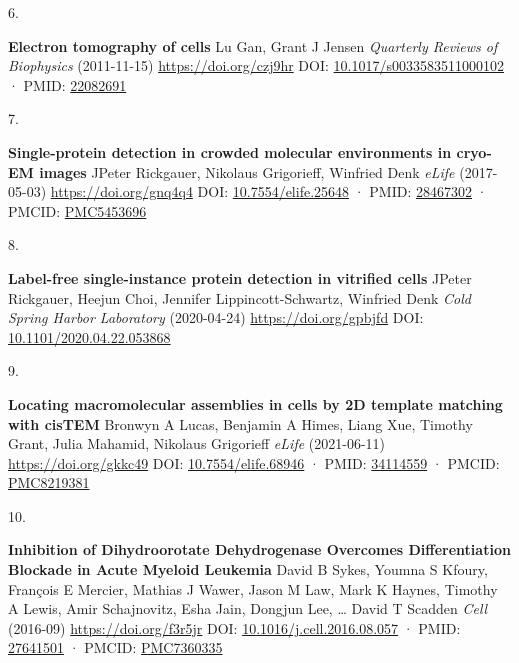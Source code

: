 \documentclass[
]{article}
\newlength{\cslhangindent}
\newlength{\csllabelwidth}
\newlength{\cslentryspacingunit} %
\newenvironment{CSLReferences}[2] %
 {%
  \setlength{\parindent}{0pt}
  \ifodd #1
  \let\oldpar\par
  \def\par{\hangindent=\cslhangindent\oldpar}
  \fi
  \setlength{\parskip}{#2\cslentryspacingunit}
 }%
 {}
\newcommand{\CSLBlock}[1]{#1\hfill\break}
\newcommand{\CSLLeftMargin}[1]{\parbox[t]{\csllabelwidth}{#1}}
\newcommand{\CSLRightInline}[1]{\parbox[t]{\linewidth - \csllabelwidth}{#1}\break}
\begin{document}
\begin{CSLReferences}{0}{0}
\leavevmode{}%
\CSLLeftMargin{6. }%
\CSLRightInline{\textbf{Electron tomography of cells}
\CSLBlock{Lu Gan, Grant J Jensen} \emph{Quarterly Reviews of Biophysics} (2011-11-15) \url{https://doi.org/czj9hr}
\CSLBlock{DOI: \href{https://doi.org/10.1017/s0033583511000102}{10.1017/s0033583511000102} · PMID: \href{https://www.ncbi.nlm.nih.gov/pubmed/22082691}{22082691}}}

\leavevmode{}%
\CSLLeftMargin{7. }%
\CSLRightInline{\textbf{Single-protein detection in crowded molecular environments in cryo-EM images}
\CSLBlock{JPeter Rickgauer, Nikolaus Grigorieff, Winfried Denk} \emph{eLife} (2017-05-03) \url{https://doi.org/gnq4q4}
\CSLBlock{DOI: \href{https://doi.org/10.7554/elife.25648}{10.7554/elife.25648} · PMID: \href{https://www.ncbi.nlm.nih.gov/pubmed/28467302}{28467302} · PMCID: \href{https://www.ncbi.nlm.nih.gov/pmc/articles/PMC5453696}{PMC5453696}}}

\leavevmode{}%
\CSLLeftMargin{8. }%
\CSLRightInline{\textbf{Label-free single-instance protein detection in vitrified cells}
\CSLBlock{JPeter Rickgauer, Heejun Choi, Jennifer Lippincott-Schwartz, Winfried Denk} \emph{Cold Spring Harbor Laboratory} (2020-04-24) \url{https://doi.org/gpbjfd}
\CSLBlock{DOI: \href{https://doi.org/10.1101/2020.04.22.053868}{10.1101/2020.04.22.053868}}}

\leavevmode{}%
\CSLLeftMargin{9. }%
\CSLRightInline{\textbf{Locating macromolecular assemblies in cells by 2D template matching with cisTEM}
\CSLBlock{Bronwyn A Lucas, Benjamin A Himes, Liang Xue, Timothy Grant, Julia Mahamid, Nikolaus Grigorieff} \emph{eLife} (2021-06-11) \url{https://doi.org/gkkc49}
\CSLBlock{DOI: \href{https://doi.org/10.7554/elife.68946}{10.7554/elife.68946} · PMID: \href{https://www.ncbi.nlm.nih.gov/pubmed/34114559}{34114559} · PMCID: \href{https://www.ncbi.nlm.nih.gov/pmc/articles/PMC8219381}{PMC8219381}}}

\leavevmode{}%
\CSLLeftMargin{10. }%
\CSLRightInline{\textbf{Inhibition of Dihydroorotate Dehydrogenase Overcomes Differentiation Blockade in Acute Myeloid Leukemia}
\CSLBlock{David B Sykes, Youmna S Kfoury, François E Mercier, Mathias J Wawer, Jason M Law, Mark K Haynes, Timothy A Lewis, Amir Schajnovitz, Esha Jain, Dongjun Lee, \ldots{} David T Scadden} \emph{Cell} (2016-09) \url{https://doi.org/f3r5jr}
\CSLBlock{DOI: \href{https://doi.org/10.1016/j.cell.2016.08.057}{10.1016/j.cell.2016.08.057} · PMID: \href{https://www.ncbi.nlm.nih.gov/pubmed/27641501}{27641501} · PMCID: \href{https://www.ncbi.nlm.nih.gov/pmc/articles/PMC7360335}{PMC7360335}}}


\end{CSLReferences}
\end{document}
